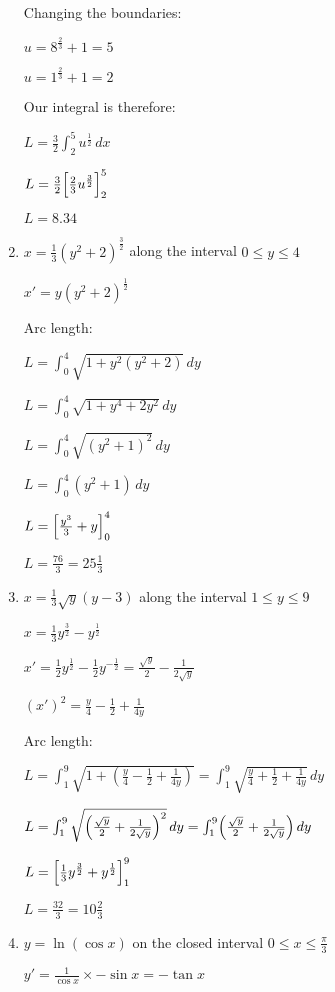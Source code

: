 \documentclass[../main.tex]{subfiles}
\begin{document}
\begin{enumerate}[itemsep=0.7cm]
    Changing the boundaries:

    $u=8^{\frac{2}{3}}+1=5$

    $u=1^{\frac{2}{3}}+1=2$

    Our integral is therefore:

    $L=\frac{3}{2}\int_2^5 u^{\frac{1}{2}}\,dx$

    $L=\frac{3}{2}\Bigl[\frac{2}{3}u^{\frac{3}{2}}\Bigr]_2^5$

    $L=8.34$

    \item 
    $x=\frac{1}{3}(y^2+2)^{\frac{3}{2}}$ along the interval $0\leq y \leq 4$

    $x'=y(y^2+2)^{\frac{1}{2}}$

    Arc length:

    $L=\int_0^4 \sqrt{1+y^2(y^2+2)}\,dy$

    $L=\int_0^4 \sqrt{1+y^4+2y^2}\,dy$

    $L=\int_0^4 \sqrt{(y^2+1)^2}\,dy$

    $L=\int_0^4 (y^2+1)\,dy$

    $L=\Bigl[\frac{y^3}{3}+y\Bigr]_0^4$

    $L=\frac{76}{3}=25\frac{1}{3}$

    \item 
    $x=\frac{1}{3}\sqrt{y}(y-3)$ along the interval $1\leq y \leq 9$

    $x=\frac{1}{3}y^{\frac{3}{2}}-y^{\frac{1}{2}}$

    $x'=\frac{1}{2}y^{\frac{1}{2}}-\frac{1}{2}y^{-\frac{1}{2}}=\frac{\sqrt{y}}{2}-\frac{1}{2\sqrt{y}}$

    $(x')^2=\frac{y}{4}-\frac{1}{2}+\frac{1}{4y}$

    Arc length:

    $L=\int_1^9 \sqrt{1+(\frac{y}{4}-\frac{1}{2}+\frac{1}{4y})}= \int_1^9\sqrt{\frac{y}{4}+\frac{1}{2}+\frac{1}{4y}}\,dy$

    $L=\int_1^9 \sqrt{\Bigl(\frac{\sqrt{y}}{2}+\frac{1}{2\sqrt{y}}\Bigr)^2}\,dy=\int_1^9 \Bigl(\frac{\sqrt{y}}{2}+\frac{1}{2\sqrt{y}}\Bigr)\,dy$

    $L=\Bigl[\frac{1}{3}y^{\frac{3}{2}}+y^{\frac{1}{2}}\Bigr]_1^9$

    $L=\frac{32}{3}=10\frac{2}{3}$

    \item 
    $y=\ln{(\cos{x})}$ on the closed interval $0 \leq x \leq \frac{\pi}{3}$

    $y'=\frac{1}{\cos{x}}\times -\sin{x}=-\tan{x}$


\end{enumerate}
\end{document}
